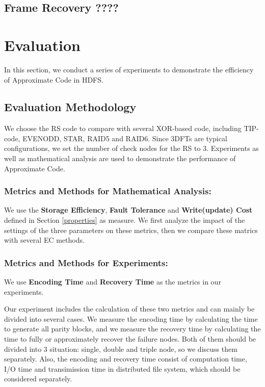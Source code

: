 \documentclass[sigconf]{acmart}
\begin{document}
\subsection{Frame Recovery ????}

\section{Evaluation}\label{evaluation}
In this section, we conduct a series of experiments to demonstrate the efficiency of Approximate Code in HDFS. 
\subsection{Evaluation Methodology }
We choose the RS code to compare with several XOR-based code, including TIP-code, EVENODD, STAR, RAID5 and RAID6. Since 3DFTs are typical configurations, we set the number of check nodes for the RS to 3.
Experiments as well as mathematical analysis are used to demonstrate the performance of Approximate Code.

\subsubsection{Metrics and Methods for Mathematical Analysis: }
We use the \textbf{Storage Efficiency}, \textbf{Fault Tolerance} and \textbf{Write(update) Cost} defined in Section \ref{properties} as measure.
We first analyze the impact of the settings of the three parameters on these metrics, then we compare these matrics with several EC methods.

\subsubsection{Metrics and Methods for Experiments: }
We use \textbf{Encoding Time} and \textbf{Recovery Time} as the metrics in our experiments.

Our experiment includes the calculation of these two metrics and can mainly be divided into several cases.
We measure the encoding time by calculating the time to generate all parity blocks, and we measure the recovery time by calculating the time to fully or approximately recover the failure nodes.
Both of them should be divided into 3 situation: single, double and triple node, so we discuss them separately.
Also, the encoding and recovery time consist of computation time, I/O time and transimission time in distributed file system, which should be considered separately.
\end{document}
